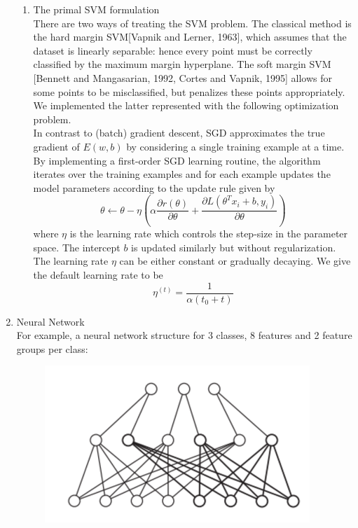 \documentclass [a4paper, 11pt, oneside, final]{article}
\numberwithin{equation}{section}		%
\numberwithin{figure}{section}			%
\numberwithin{table}{section}				%
\begin{document}
\begin{enumerate}
\begin{enumerate}
\item The primal SVM formulation\\
There are two ways of treating the SVM problem. The classical method is the hard margin SVM[Vapnik and Lerner, 1963], which assumes that the dataset is linearly separable: hence every point must be correctly classified by the maximum margin hyperplane. The soft margin SVM [Bennett and Mangasarian, 1992, Cortes and Vapnik, 1995] allows for some points to be misclassified, but penalizes these points appropriately. We implemented the latter represented with the following optimization problem.\\
In contrast to (batch) gradient descent, SGD approximates the true gradient of $E(w, b)$ by considering a single training example at a time.\\
By implementing a first-order SGD learning routine, the algorithm iterates over the training examples and for each example updates the model parameters according to the update rule given by $$\theta \leftarrow \theta - \eta(\alpha \frac{\partial r(\theta)}{\partial \theta} + \frac{\partial L(\theta^Tx_{i} + b, y_{i})}{\partial \theta})  $$ 
where $\eta$ is the learning rate which controls the step-size in the parameter space. The intercept $b$ is updated similarly but without regularization.\\
The learning rate $\eta$ can be either constant or gradually decaying. We give the default learning rate to be 
$$ \eta^{(t)} = \frac{1}{\alpha(t_{0} + t)}$$

\end{enumerate}

\item Neural Network  \\
For example, a neural network structure for 3 classes, 8 features and 2 feature groups per class:
\begin{figure}[h]
\includegraphics[width = 10cm]{nn}
\end{figure}			        
\end{enumerate}
\end{document}

